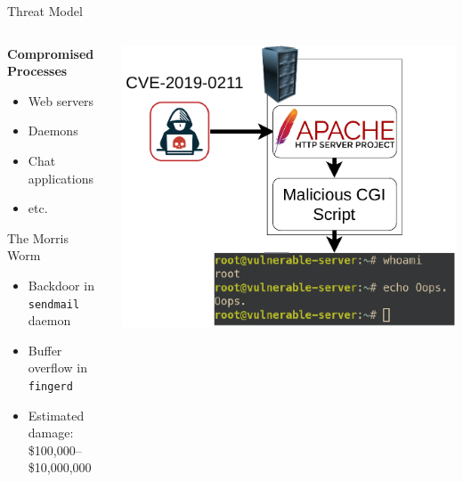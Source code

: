 \documentclass[12pt, dvipsnames, aspectratio=169]{beamer}
\begin{document}
\begin{frame}[t]{Threat Model}
\begin{columns}
    \begin{column}{0.45\textwidth}
        \textbf{Compromised Processes}
        \begin{itemize}
            \item Web servers
            \item Daemons
            \item Chat applications
            \item etc.
        \end{itemize}
        \vspace{2em}
        The Morris Worm
        \begin{itemize}
            \item Backdoor in \texttt{sendmail} daemon
            \item Buffer overflow in \texttt{fingerd}
            \item Estimated damage: \$100,000--\$10,000,000
        \end{itemize}
    \end{column}
    \begin{column}{0.55\textwidth}
        \color{black}
        \includegraphics[width=1\textwidth]{figs/threat-model.pdf}
    \end{column}
\end{columns}
\end{frame}
\end{document}
